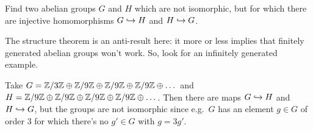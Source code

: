 \begin{problem}
	\gim
	Find two abelian groups $G$ and $H$ which are not isomorphic,
	but for which there are injective homomorphisms
	$G \hookrightarrow H$ and $H \hookrightarrow G$.
	\begin{hint}
		The structure theorem is an anti-result here:
		it more or less implies that finitely generated abelian groups won't work.
		So, look for an infinitely generated example.
	\end{hint}
	\begin{sol}
		Take $G = \mathbb Z/3\mathbb Z \oplus \mathbb Z/9\mathbb Z \oplus \mathbb Z/9\mathbb Z \oplus \mathbb Z/9\mathbb Z \oplus \dots$
		and $H = \mathbb Z/9\mathbb Z \oplus \mathbb Z/9\mathbb Z \oplus \mathbb Z/9\mathbb Z \oplus \mathbb Z/9\mathbb Z \oplus \dots$.
		Then there are maps $G \hookrightarrow H$ and $H \hookrightarrow G$,
		but the groups are not isomorphic since e.g.\
		$G$ has an element $g \in G$ of order $3$
		for which there's no $g' \in G$ with $g = 3g'$.
	\end{sol}
\end{problem}
